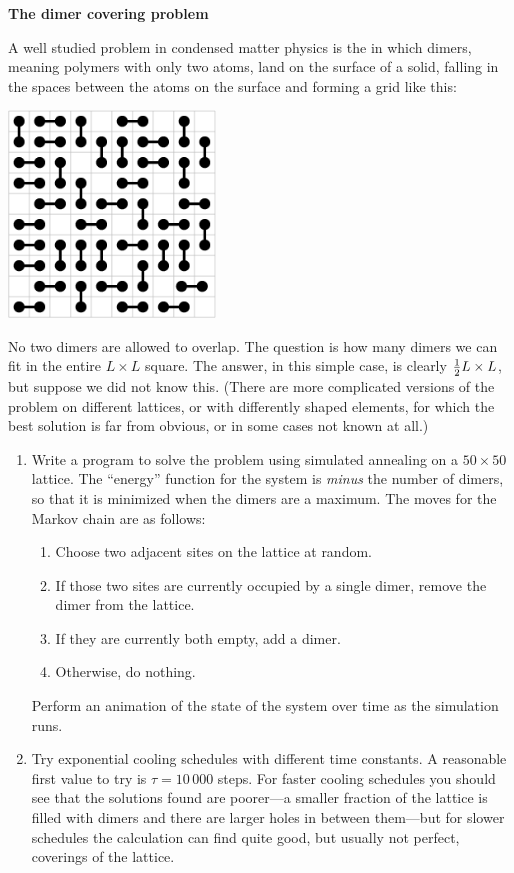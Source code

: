 \documentclass[12pt]{article}
\begin{document}
\begin{exercises}

\exercise \textbf{The dimer covering problem}

\exskip A well studied problem in condensed matter
physics is the  in which dimers,
meaning polymers with only two atoms, land on the surface of a
solid, falling in the spaces between the atoms on the surface and forming a
grid like this:
\medskip
\begin{center}
\includegraphics[width=5.5cm]{dimer.eps}
\end{center}
No two dimers are allowed to overlap.  The question is how many dimers we
can fit in the entire $L\times L$ square.  The answer, in this simple case,
is clearly $\tfrac12 L\times L$, but suppose we did not know this.  (There are
more complicated versions of the problem on different lattices, or with
differently shaped elements, for which the best solution is far from
obvious, or in some cases not known at all.)
\begin{enumerate}\setlength{\itemsep}{0pt}
\item Write a program to solve the problem using simulated annealing
  on a $50\times50$ lattice.  The ``energy'' function for the system is
  \emph{minus} the number of dimers, so that it is minimized when the
  dimers are a maximum.  The moves for the Markov chain are as follows:
{\renewcommand{\labelenumii}{\roman{enumii})\ }
\begin{enumerate}\setlength{\itemsep}{0pt}\setlength{\parskip}{0pt}
\item Choose two adjacent sites on the lattice at random.
\item If those two sites are currently occupied by a single dimer, remove
  the dimer from the lattice.
\item If they are currently both empty, add a dimer.
\item Otherwise, do nothing.
\end{enumerate}}
Perform an animation of the state of the system over time as the simulation
runs.
\item Try exponential cooling schedules with different time
  constants.  A reasonable first value to try is $\tau=10\,000$ steps.  For
  faster cooling schedules you should see that the solutions found are
  poorer---a smaller fraction of the lattice is filled with dimers and
  there are larger holes in between them---but for slower schedules the
  calculation can find quite good, but usually not perfect, coverings of
  the lattice.
\end{enumerate}



\end{exercises}
\end{document}
